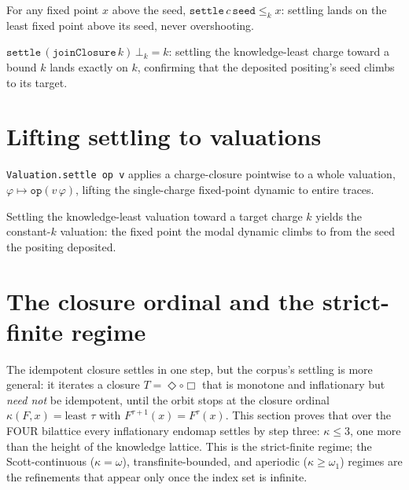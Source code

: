 \begin{theorem}\label{thm:settle-least}\leanok{}
For any fixed point $x$ above the seed, $\texttt{settle}\,c\,\texttt{seed} \le_k x$:
settling lands on the least fixed point above its seed, never overshooting.
\end{theorem}

\begin{theorem}\label{thm:settle-kbot}\leanok{}
$\texttt{settle}\,(\texttt{joinClosure}\,k)\,\bot_k = k$: settling the
knowledge-least charge toward a bound $k$ lands exactly on $k$, confirming that
the deposited positing's seed climbs to its target.
\end{theorem}

\section{Lifting settling to valuations}

\begin{definition}\label{def:valuation-settle}\leanok{}
\texttt{Valuation.settle op v} applies a charge-closure pointwise to a whole
valuation, $\varphi \mapsto \texttt{op}(v\,\varphi)$, lifting the single-charge
fixed-point dynamic to entire traces.
\end{definition}

\begin{theorem}\label{thm:settle-knowledgeleast}\leanok{}
Settling the knowledge-least valuation toward a target charge $k$ yields the
constant-$k$ valuation: the fixed point the modal dynamic climbs to from the
seed the positing deposited.
\end{theorem}

\section{The closure ordinal and the strict-finite regime}

The idempotent closure settles in one step, but the corpus's settling is more
general: it iterates a closure $T = \Diamond\circ\Box$ that is monotone and
inflationary but \emph{need not} be idempotent, until the orbit stops at the
closure ordinal $\kappa(F,x) = \text{least } \tau$ with $F^{\tau+1}(x) =
F^{\tau}(x)$. This section proves that over the FOUR bilattice every inflationary
endomap settles by step three: $\kappa \le 3$, one more than the height of the
knowledge lattice. This is the strict-finite regime; the Scott-continuous
($\kappa=\omega$), transfinite-bounded, and aperiodic ($\kappa \ge \omega_1$)
regimes are the refinements that appear only once the index set is infinite.

